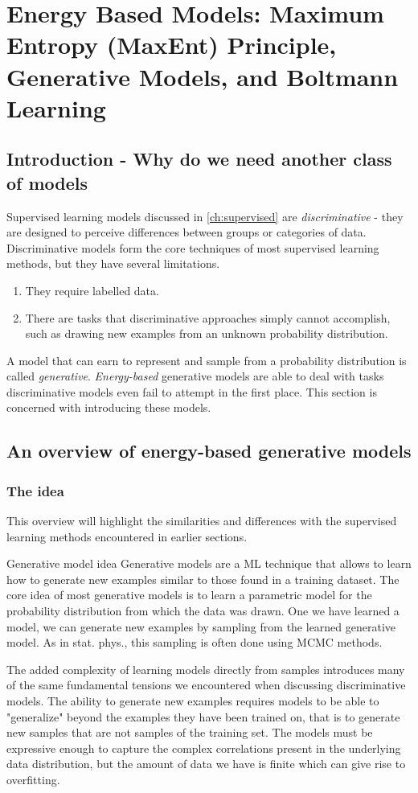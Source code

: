 \section{Energy Based Models: Maximum Entropy (MaxEnt) Principle, Generative Models, and Boltmann Learning}
\label{sec:energy}
\subsection{Introduction - Why do we need another class of models}
Supervised learning models discussed in \ref{ch:supervised} are \emph{discriminative} - they are designed to perceive differences between groups or categories of data. Discriminative models form the core techniques of most supervised learning methods, but they have several limitations.
\begin{enumerate}
	\item They require labelled data.
	\item There are tasks that discriminative approaches simply cannot accomplish, such as drawing new examples from an unknown probability distribution. 
\end{enumerate}

	A model that can earn to represent and sample from a probability distribution is called \emph{generative}. \emph{Energy-based} generative models are able to deal with tasks discriminative models even fail to attempt in the first place. This section is concerned with introducing these models.

\subsection{An overview of energy-based generative models}
\label{subsec:energyOverview}
\subsubsection{The idea}
This overview will highlight the similarities and differences with the supervised learning methods encountered in earlier sections.\\
\begin{mybox}{Generative model idea}
	Generative models are a ML technique that allows to learn how to generate new examples similar to those found in a training dataset. The core idea of most generative models is to learn a parametric model for the probability distribution from which the data was drawn. One we have learned a model, we can generate new examples by sampling from the learned generative model. As in stat. phys., this sampling is often done using MCMC methods.
\end{mybox}
The added complexity of learning models directly from samples introduces many of the same fundamental tensions we encountered when discussing discriminative models. The ability to generate new examples requires models to be able to "generalize" beyond the examples they have been trained on, that is to generate new samples that are not samples of the training set. The models must be expressive enough to capture the complex correlations present in the underlying data distribution, but the amount of data we have is finite which can give rise to overfitting.
